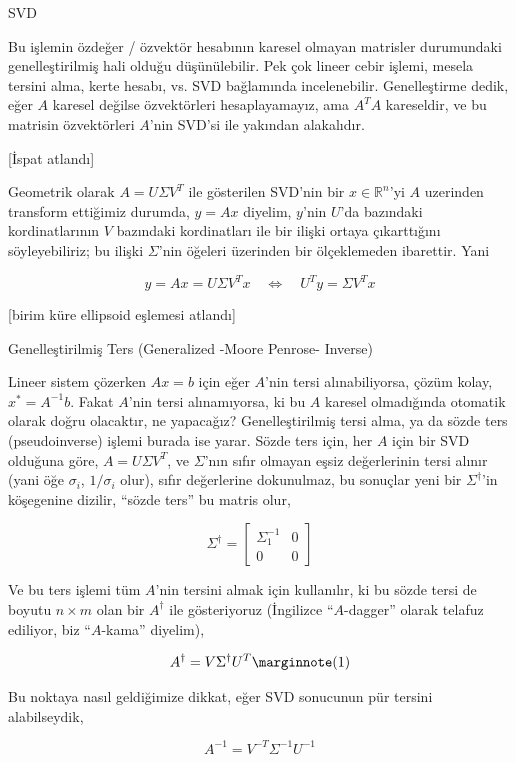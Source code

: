 \documentclass[12pt,fleqn]{article}\usepackage{../../common}
\begin{document}
SVD 

Bu işlemin özdeğer / özvektör hesabının karesel olmayan matrisler
durumundaki genelleştirilmiş hali olduğu düşünülebilir. Pek çok lineer
cebir işlemi, mesela tersini alma, kerte hesabı, vs. SVD bağlamında
incelenebilir. Genelleştirme dedik, eğer $A$ karesel değilse özvektörleri
hesaplayamayız, ama $A^TA$ kareseldir, ve bu matrisin özvektörleri $A$'nin
SVD'si ile yakından alakalıdır.

[İspat atlandı]

Geometrik olarak $A = U \Sigma V^T$ ile gösterilen SVD'nin bir $x \in
\mathbb{R}^n$'yi $A$ uzerinden transform ettiğimiz durumda, $y = Ax$
diyelim, $y$'nin $U$'da bazındaki kordinatlarının $V$ bazındaki
kordinatları ile bir ilişki ortaya çıkarttığını söyleyebiliriz; bu ilişki
$\Sigma$'nin öğeleri üzerinden bir ölçeklemeden ibarettir. Yani

$$ y = Ax = U\Sigma V^Tx 
\quad \Leftrightarrow \quad
U^Ty = \Sigma V^T x
$$

[birim küre ellipsoid eşlemesi atlandı]

Genelleştirilmiş Ters (Generalized -Moore Penrose- Inverse)

Lineer sistem çözerken $Ax = b$ için eğer $A$'nin tersi alınabiliyorsa,
çözüm kolay, $x^\ast = A^{-1}b$. Fakat $A$'nin tersi alınamıyorsa, ki bu $A$
karesel olmadığında otomatik olarak doğru olacaktır, ne yapacağız?
Genelleştirilmiş tersi alma, ya da sözde ters (pseudoinverse) işlemi burada
ise yarar. Sözde ters için, her $A$ için bir SVD olduğuna göre, $A = U
\Sigma V^T$, ve $\Sigma$'nın sıfır olmayan eşsiz değerlerinin tersi alınır (yani 
öğe $\sigma_i$, $1/\sigma_i$ olur), sıfır değerlerine dokunulmaz, bu sonuçlar yeni 
bir $\Sigma^{\dagger}$'in köşegenine dizilir, ``sözde ters'' bu matris olur,

$$ \Sigma^{\dagger} = \left[\begin{array}{cc}
\Sigma_1^{-1} & 0 \\ 0 & 0 
\end{array}\right]$$

Ve bu ters işlemi tüm $A$'nin tersini almak için kullanılır, ki bu sözde
tersi de boyutu $n \times m$ olan bir $A^{\dagger}$ ile gösteriyoruz
(İngilizce ``$A$-dagger'' olarak telafuz ediliyor, biz ``$A$-kama''
diyelim), 

$$ 
A^{\dagger} = V \Sigma^{\dagger} U^T  
\mlabel{1}
$$

Bu noktaya nasıl geldiğimize dikkat, eğer SVD sonucunun pür tersini
alabilseydik, 

$$ A^{-1} = V^{-T}\Sigma^{-1}U^{-1} $$
\end{document}
